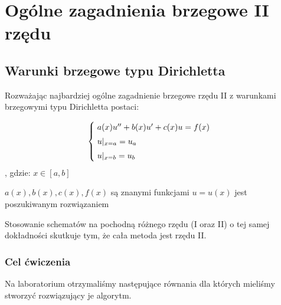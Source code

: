 \section{Ogólne zagadnienia brzegowe II rzędu}
\subsection{Warunki brzegowe typu Dirichletta}

Rozważając najbardziej ogólne zagadnienie brzegowe rzędu II z warunkami brzegowymi typu Dirichletta postaci:

\[
\begin{cases}
\vspace{0.1cm} 
\hspace{0,1cm} a(x) u'' + b(x)u' + c(x)u =f(x) \\
\vspace{0.1cm}
\hspace{0,1cm}u|_{x=a} = u_{a} \\
\hspace{0,1cm}u|_{x=b} = u_{b}
\end{cases}
\]
, gdzie:
$x\in[a,b]$

$a(x), b(x), c(x), f(x)$ są znanymi funkcjami
\newline
$u = u(x)$ jest poszukiwanym rozwiązaniem
\newline

Stosowanie schematów na pochodną różnego rzędu (I oraz II) o tej samej dokładności skutkuje tym, że cała metoda jest rzędu II.

\subsubsection{Cel ćwiczenia}
Na laboratorium otrzymaliśmy następujące równania dla których mieliśmy stworzyć rozwiązujący je algorytm.

